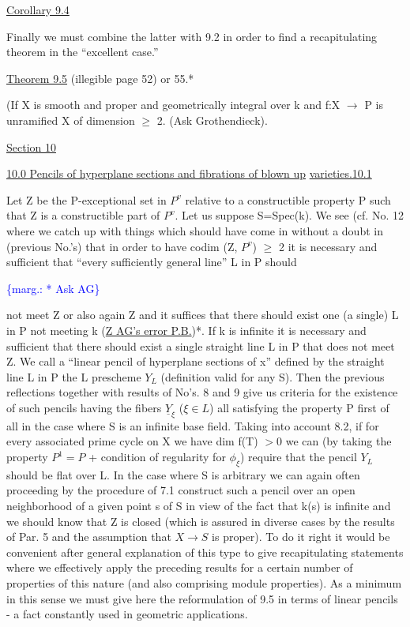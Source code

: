 \documentclass[11pt]{article}
\newcommand{\scanpage}[1]{\par\bigskip\noindent{\small\sffamily[scan #1]}\par}
\newcommand{\mspage}[1]{{\small\sffamily[p.\,#1]}}
\newcommand{\margin}[1]{\textcolor{blue}{\{\textsf{marg.:} #1\}}}
\newcommand{\uline}[1]{\underline{#1}}
\begin{document}
\uline{Corollary 9.4}

Finally we must combine the latter with 9.2 in order to find
a recapitulating theorem in the ``excellent case.''

\uline{Theorem 9.5}  (illegible page 52) or 55.*

(If X is smooth and proper and geometrically integral over k and
f:X $\rightarrow$ P is unramified X of dimension $\geq$ 2.  (Ask Grothendieck).

\uline{Section 10}

\uline{10.0  Pencils of hyperplane sections and fibrations of blown up}
\uline{varieties.10.1}

Let Z be the P-exceptional set in $P^{v}$ relative to a
constructible property P such that Z is a constructible part of $P^{v}$.
Let us suppose S=Spec(k).  We see (cf. No. 12 where we catch up
with things which should have come in without a doubt in (previous
No.'s) that in order to have codim (Z, $P^{v}$) $\geq$ 2 it is necessary and
sufficient that ``every sufficiently general line'' L in P should

\margin{* Ask AG}

\clearpage
\scanpage{24/67}
\mspage{67}

not meet Z or also again Z and it suffices that there should exist
one (a single) L in P not meeting k (\uline{Z AG's error P.B.})*. If k is
infinite it is necessary and sufficient that there should exist a
single straight line L in P that does not meet Z. We call a
``linear pencil of hyperplane sections of x'' defined by the
straight line L in P the L prescheme $Y_L$ (definition valid for any
S). Then the previous reflections together with results of No's.
8 and 9 give us criteria for the existence of such pencils having
the fibers $\underline{Y}_\xi$ ($\xi \in L$) all satisfying the property P first of all in
the case where S is an infinite base field. Taking into account
8.2, if for every associated prime cycle on X we have dim f(T) $> 0$
we can (by taking the property $P^1 = P$ + condition of regularity for
$\phi_\xi$) require that the pencil $Y_L$ should be flat over L. In the case
where S is arbitrary we can again often proceeding by the
procedure of 7.1 construct such a pencil over an open neighborhood
of a given point s of S in view of the fact that k(s) is infinite
and we should know that Z is closed (which is assured in diverse
cases by the results of Par. 5 and the assumption that $X \to S$ is
proper). To do it right it would be convenient after general
explanation of this type to give recapitulating statements where
we effectively apply the preceding results for a certain number of
properties of this nature (and also comprising module properties).
As a minimum in this sense we must give here the reformulation of
9.5 in terms of linear pencils - a fact constantly used in
geometric applications.
\end{document}
